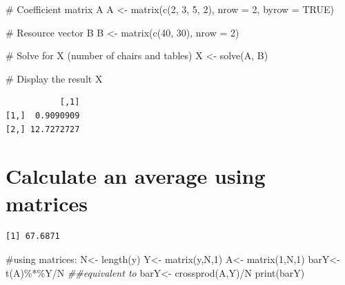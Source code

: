 \documentclass[
  letterpaper,
  DIV=11,
  numbers=noendperiod]{scrartcl}
\newenvironment{Shaded}{\begin{snugshade}}{\end{snugshade}}
\newcommand{\AttributeTok}[1]{\textcolor[rgb]{0.40,0.45,0.13}{#1}}
\newcommand{\CommentTok}[1]{\textcolor[rgb]{0.37,0.37,0.37}{#1}}
\newcommand{\ConstantTok}[1]{\textcolor[rgb]{0.56,0.35,0.01}{#1}}
\newcommand{\DecValTok}[1]{\textcolor[rgb]{0.68,0.00,0.00}{#1}}
\newcommand{\DocumentationTok}[1]{\textcolor[rgb]{0.37,0.37,0.37}{\textit{#1}}}
\newcommand{\FunctionTok}[1]{\textcolor[rgb]{0.28,0.35,0.67}{#1}}
\newcommand{\NormalTok}[1]{\textcolor[rgb]{0.00,0.23,0.31}{#1}}
\newcommand{\OtherTok}[1]{\textcolor[rgb]{0.00,0.23,0.31}{#1}}
\newcommand{\SpecialCharTok}[1]{\textcolor[rgb]{0.37,0.37,0.37}{#1}}
\begin{document}
\begin{Shaded}
\begin{Highlighting}[]
\CommentTok{\# Coefficient matrix A}
\NormalTok{A }\OtherTok{\textless{}{-}} \FunctionTok{matrix}\NormalTok{(}\FunctionTok{c}\NormalTok{(}\DecValTok{2}\NormalTok{, }\DecValTok{3}\NormalTok{, }\DecValTok{5}\NormalTok{, }\DecValTok{2}\NormalTok{), }\AttributeTok{nrow =} \DecValTok{2}\NormalTok{, }\AttributeTok{byrow =} \ConstantTok{TRUE}\NormalTok{)}

\CommentTok{\# Resource vector B}
\NormalTok{B }\OtherTok{\textless{}{-}} \FunctionTok{matrix}\NormalTok{(}\FunctionTok{c}\NormalTok{(}\DecValTok{40}\NormalTok{, }\DecValTok{30}\NormalTok{), }\AttributeTok{nrow =} \DecValTok{2}\NormalTok{)}

\CommentTok{\# Solve for X (number of chairs and tables)}
\NormalTok{X }\OtherTok{\textless{}{-}} \FunctionTok{solve}\NormalTok{(A, B)}

\CommentTok{\# Display the result}
\NormalTok{X}
\end{Highlighting}
\end{Shaded}

\begin{verbatim}
           [,1]
[1,]  0.9090909
[2,] 12.7272727
\end{verbatim}

\section{Calculate an average using
matrices}\label{calculate-an-average-using-matrices}

\begin{Shaded}
\end{Shaded}

\begin{verbatim}
[1] 67.6871
\end{verbatim}

\begin{Shaded}
\begin{Highlighting}[]
\CommentTok{\#using matrices:}
\NormalTok{N}\OtherTok{\textless{}{-}} \FunctionTok{length}\NormalTok{(y)}
\NormalTok{Y}\OtherTok{\textless{}{-}} \FunctionTok{matrix}\NormalTok{(y,N,}\DecValTok{1}\NormalTok{)}
\NormalTok{A}\OtherTok{\textless{}{-}} \FunctionTok{matrix}\NormalTok{(}\DecValTok{1}\NormalTok{,N,}\DecValTok{1}\NormalTok{)}
\NormalTok{barY}\OtherTok{\textless{}{-}} \FunctionTok{t}\NormalTok{(A)}\SpecialCharTok{\%*\%}\NormalTok{Y}\SpecialCharTok{/}\NormalTok{N}
\DocumentationTok{\#\#equivalent to}
\NormalTok{barY}\OtherTok{\textless{}{-}} \FunctionTok{crossprod}\NormalTok{(A,Y)}\SpecialCharTok{/}\NormalTok{N}
\FunctionTok{print}\NormalTok{(barY)}
\end{Highlighting}
\end{Shaded}
\end{document}
